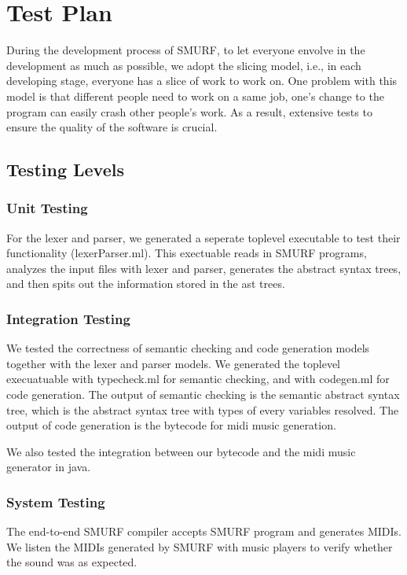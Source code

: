 \section{Test Plan}

During the development process of SMURF, to let everyone envolve in the development as much as possible, we adopt the slicing model, 
i.e., in each developing stage, everyone has a slice of work to work on.
One problem with this model is that different people need to work on a same job, 
one's change to the program can easily crash other people's work. 
As a result, extensive tests to ensure the quality of the software is crucial. 

\subsection{Testing Levels}
\subsubsection{Unit Testing}
For the lexer and parser, we generated a seperate toplevel executable to test their functionality (lexerParser.ml). 
This exectuable reads in SMURF programs, analyzes the input files with lexer and parser, generates the abstract syntax trees, 
 and then spits out the information stored in the ast trees.

\subsubsection{Integration Testing}
We tested the correctness of semantic checking and code generation models together with the lexer and parser models.
We generated the toplevel execuatuable with typecheck.ml for semantic checking, and with codegen.ml for code generation. 
The output of semantic checking is the semantic abstract syntax tree, 
which is the abstract syntax tree with types of every variables resolved.
The output of code generation is the bytecode for midi music generation.

We also tested the integration between our bytecode and the midi music generator in java.

\subsubsection{System Testing}
The end-to-end SMURF compiler accepts SMURF program and generates MIDIs. 
We listen the MIDIs generated by SMURF with music players to verify whether the sound was as expected.

